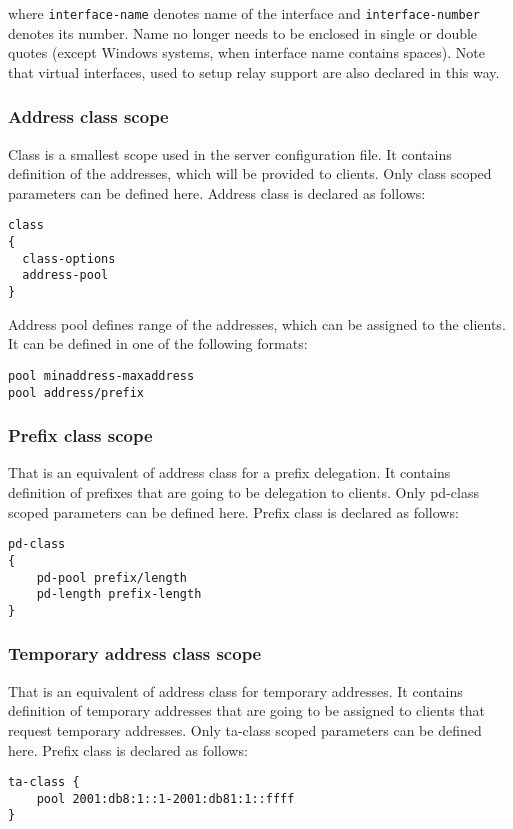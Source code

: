 where \verb+interface-name+ denotes name of the interface and
\verb+interface-number+ denotes its number. Name no longer needs to be
enclosed in single or double quotes (except Windows systems, when
interface name contains spaces). Note that virtual interfaces, used
to setup relay support are also declared in this way.

\subsubsection{Address class scope}
\label{server-class-scope}
Class is a smallest scope used in the server configuration file. It
contains definition of the addresses, which will be provided to
clients. Only class scoped parameters can be defined here. Address class
is declared as follows:
\begin{lstlisting}
class
{
  class-options
  address-pool
}
\end{lstlisting}

Address pool defines range of the addresses, which can be assigned to the
clients. It can be defined in one of the following formats:
\begin{lstlisting}
pool minaddress-maxaddress
pool address/prefix
\end{lstlisting}

\subsubsection{Prefix class scope}
\label{server-pd-class-scope}
That is an equivalent of address class for a prefix delegation. It
contains definition of prefixes that are going to be delegation to
clients. Only pd-class scoped parameters can be defined here. Prefix
class is declared as follows:
\begin{lstlisting}
pd-class
{
    pd-pool prefix/length
    pd-length prefix-length
}
\end{lstlisting}

\subsubsection{Temporary address class scope}
\label{server-ta-class-scope}
That is an equivalent of address class for temporary addresses. It
contains definition of temporary addresses that are going to be
assigned to clients that request temporary addresses. Only ta-class
scoped parameters can be defined here. Prefix class is declared as
follows:
\begin{lstlisting}
ta-class {
    pool 2001:db8:1::1-2001:db81:1::ffff
}
\end{lstlisting}


